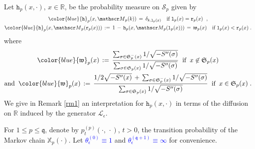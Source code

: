 \documentclass[reqno]{amsart}
\theoremstyle{plain}
\theoremstyle{definition}
\newcommand{\mf}[1]{{\mathfrak #1}}
\newcommand{\bb}[1]{{\mathbb #1}}
\newcommand{\ms}[1]{{\mathscr #1}}
\newcommand{\mtt}[1]{{\mathtt #1}}
\newcounter{as}[section]
\newcommand{\<}{\langle}
\renewcommand{\>}{\rangle}
\begin{document}
Let $\mtt h_p (x, \cdot)$, $x\in \bb R$, be the
probability measure on $\ms S_p$ given by
\begin{equation}
\label{74}
\begin{gathered}
{\color{blue} \mtt h_p (x, \ms M_p(k)) }
\,=\, \delta_{k,\mtt l_p(x)} \quad
\text{if $\mtt l_p(x) = \mtt r_p(x)$ }\;,
\\
{\color{blue} \mtt h_p (x, \ms M_p(\mtt r_p(x)) )}  \,:=\, 
1\,-\, \mtt h_p (x, \ms M_p(\mtt l_p(x)) ) \,=\,
\mf w_p(x)
\quad
\text{if $\mtt l_p(x) < \mtt r_p(x)$}\;.
\end{gathered}
\end{equation}
where
\begin{equation}
\label{92}
\begin{gathered}
{\color{blue}\mf w_p(x)}  \,:=\,
\frac{\sum_{\sigma \in \mf S^-_p(x)}  1/\sqrt{- S''(\sigma)}}
{\sum_{\sigma \in \mf S_p(x)} 1/\sqrt{- S''(\sigma)}} \;\;
\text{if}\;\; x\not\in \mf S_p(x)
\\
\text{and}\;\;
{\color{blue}\mf w_p(x)}  \,:=\,
\frac{1/2 \sqrt{- S''(x)}
\,+\, \sum_{\sigma \in \mf S^-_p(x)}  1/\sqrt{- S''(\sigma)}}
{\sum_{\sigma \in \mf S_p(x)} 1/\sqrt{- S''(\sigma)}} \;\;
\text{if}\;\; x \in \mf S_p(x)\;.
\end{gathered}
\end{equation}
We give in Remark \ref{rm1} an interpretation for
$\mtt h_p (x, \cdot)$ in terms of the diffusion on $\bb R$ induced by
the generator $\ms L_\epsilon$.

For $1\le p\le \mf q$, denote by $p_{t}^{(p)}(\cdot,\,\cdot)$, $t>0$,
the transition probability of the Markov chain $\bb X_p(\cdot)$.  Let
\textcolor{blue}{$\theta_{\epsilon}^{(0)}\equiv1$} and
\textcolor{blue}{$\theta_{\epsilon}^{(\mathfrak{q}+1)}\equiv\infty$}
for convenience.
\end{document}
